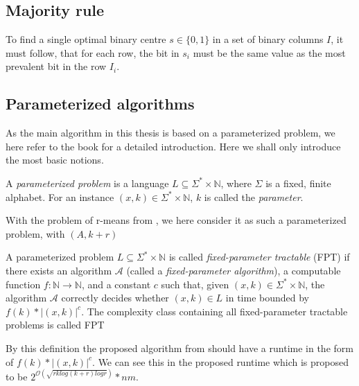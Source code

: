\documentclass[a4paper]{article}
\begin{document}
\subsection{Majority rule}
To find a single optimal binary centre $s \in \{0,1\}$ in a set of binary columns $I$, it must follow, that for each row,
the bit in $s_i$ must be the same value as the most prevalent bit in the row $I_i$.

\subsection{Parameterized algorithms}
As the main algorithm in this thesis is based on a parameterized problem, we here refer to the
book \cite{param_algo_book} for a detailed introduction. Here we shall only introduce the most
basic notions.

\begin{theoremdefinition}{\cite[p.~12]{param_algo_book}}
    A \textit{parameterized problem} is a language $L \subseteq \Sigma^* \times \mathbb{N}$,
    where $\Sigma$ is a fixed, finite alphabet. For an instance $(x,k) \in \Sigma^* \times \mathbb{N}$,
    $k$ is called the \textit{parameter}. 
\end{theoremdefinition}

With the problem of r-means from \cite{fomin_golovach_panolan_2020}, we here consider it as such
a parameterized problem, with $(A,k+r)$

\begin{theoremdefinition}{\cite[p.~13]{param_algo_book}}
    A parameterized problem $L \subseteq \Sigma^* \times \mathbb{N}$ is called
    \textit{fixed-parameter tractable} (FPT) if there exists an algorithm $\mathcal{A}$ (called
    a \textit{fixed-parameter algorithm}), a computable function $f:\mathbb{N} \rightarrow \mathbb{N}$,
    and a constant $c$ such that, given $(x,k) \in \Sigma^* \times \mathbb{N}$, the algorithm
    $\mathcal{A}$ correctly decides whether $(x,k) \in L$ in time bounded by $f(k) * |(x,k)|^c$.
    The complexity class containing all fixed-parameter tractable problems is called FPT
\end{theoremdefinition}

By this definition the proposed algorithm from \cite{fomin_golovach_panolan_2020} should have
a runtime in the form of $f(k) * |(x,k)|^c$. We can see this in the proposed runtime which is
proposed to be $2^{\mathcal{O} (\sqrt{rk log(k+r) logr})}*nm$.
\end{document}
